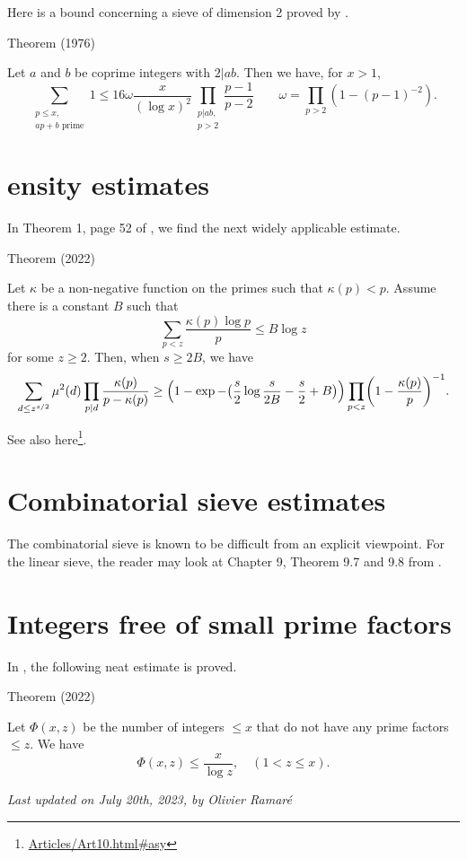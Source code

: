 \par 
Here is a bound concerning a sieve of dimension 2 proved by
\cite{Siebert*76}.
\par 
\begin{thm}{Theorem (1976)}

Let $a$ and $b$ be coprime integers with $2|ab$. Then we have, for $x>1$,
$$
\sum_{\substack{p\le x,\\ \text{$ap+b$ prime}}}1
\le 16 \omega\frac{x}{(\log x)^2}\prod_{\substack{p|ab,\\ p >
2}}\frac{p-1}{p-2}
\qquad \omega=\prod_{p > 2}(1-(p-1)^{-2}).
$$
\end{thm}


\section{ensity estimates }


In Theorem 1, page 52 of
\cite{Greaves*01},
we find the next widely applicable estimate.
\par 
\begin{thm}{Theorem (2022)}

    Let $\kappa$ be a non-negative function on the primes such that
    $\kappa(p) < p$. Assume there is a constant $B$ such that
		 $$
		 \sum_{p < z} \frac{\kappa(p)\log p}{p}
			   \le B\log z
			   $$
			   for some $z\ge 2$. Then, when $s\ge 2B$, we
			   have
			   $$
			   \sum_{d\le z^{s/2}}\mu^2(d)
			   \prod_{p|d}\frac{\kappa(p)}{p-\kappa(p)}
			   \ge
			   \Bigl(1-\exp-\bigl(\frac{s}{2}\log\frac{s}{2B}-\frac{s}{2}+B\bigr)\Bigr)
			   \prod_{p < z}\biggl(1-\frac{\kappa(p)}{p}\biggr)^{-1}.
			   $$
\end{thm}

See also here\footnote{\url{Articles/Art10.html#asy}}.


\section{Combinatorial sieve estimates}


The combinatorial sieve is known to be difficult from an explicit
viewpoint. For the linear sieve, the reader may look at Chapter 9,
Theorem 9.7 and 9.8 from
\cite{Nathanson*96-2}.


\section{Integers free of small prime factors}


In
\cite{Fan*22}, 
the following neat estimate is proved.
\par 
\begin{thm}{Theorem (2022)}

Let $\Phi(x,z)$ be the number of integers $\le x$ that do not have any
prime factors $\le z$. We have
$$
\Phi(x,z)\le \frac{x}{\log z},
\quad(1 < z\le x).
$$
\end{thm}







  
\begin{flushright}\small\sl{}   Last updated on July 20th, 2023, by Olivier Ramar\'e
 \end{flushright}














